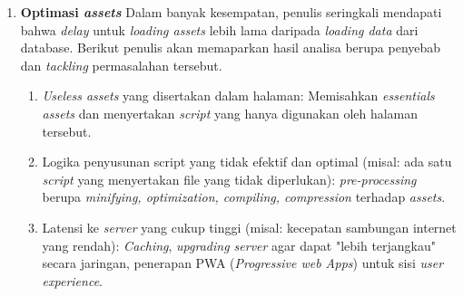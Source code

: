 \begin{enumerate}
		\item \textbf{Optimasi \textit{assets}} \newline
		\indent Dalam banyak kesempatan, penulis seringkali mendapati bahwa \textit{delay} untuk \textit{loading assets} lebih lama daripada \textit{loading data} dari database. Berikut penulis akan memaparkan hasil analisa berupa penyebab dan \textit{tackling} permasalahan tersebut.
			\begin{enumerate}
				\item \textit{Useless assets} yang disertakan dalam halaman: Memisahkan \textit{essentials assets} dan menyertakan \textit{script} yang hanya digunakan oleh halaman tersebut.
				\item Logika penyusunan script yang tidak efektif dan optimal (misal: ada satu \textit{script} yang menyertakan file yang tidak diperlukan): \textit{pre-processing} berupa \textit{minifying, optimization, compiling, compression} terhadap \textit{assets}.
				\item Latensi ke \textit{server} yang cukup tinggi (misal: kecepatan sambungan internet yang rendah): \textit{Caching}, \textit{upgrading server} agar dapat "lebih terjangkau" secara jaringan, penerapan PWA (\textit{Progressive \textit{web} Apps}) untuk sisi \textit{user experience}.
			\end{enumerate}
	\end{enumerate}